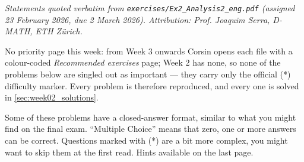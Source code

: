 
\textit{Statements quoted verbatim from \texttt{exercises/Ex2\_Analysis2\_eng.pdf} (assigned 23
February 2026, due 2 March 2026). Attribution: Prof. Joaquim Serra, D-MATH, ETH Z\"urich.}

\begin{ainote}
No priority page this week: from Week 3 onwards Corsin opens each file with a colour-coded
\textit{Recommended exercises} page; Week 2 has none, so none of the problems below are singled
out as important --- they carry only the official (*) difficulty marker. Every problem is
therefore reproduced, and every one is solved in \cref{sec:week02_solutions}.
\end{ainote}

\begin{notation}
Some of these problems have a closed-answer format, similar to what you might find on the final
exam. ``Multiple Choice'' means that zero, one or more answers can be correct. Questions marked
with (*) are a bit more complex, you might want to skip them at the first read. Hints available
on the last page.
\end{notation}

